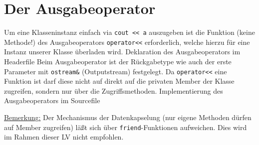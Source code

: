 \section{Der Ausgabeoperator}
\label{p:9.8}
Um eine Klasseninstanz einfach via \verb|cout << a|  auszugeben ist die
Funktion (keine Methode!) des Ausgabeoperators \verb|operator<<| erforderlich, welche
hierzu für eine Instanz unserer Klasse überladen wird.
%
{Deklaration des Ausgabeoperators im Headerfile}
%
Beim Ausgabeoperator ist der Rückgabetype wie auch der erste Parameter mit \verb|ostream&|
(Outputstream) festgelegt. Da \verb|operator<<| eine Funktion ist darf diese
nicht auf direkt auf die privaten Member der Klasse zugreifen, sondern
nur über die Zugriffsmethoden.
%
{Implementierung des Ausgabeoperators im Sourcefile}
%

\underline{Bemerkung:} Der Mechanismus der Datenkapselung
(nur eigene Methoden dürfen auf Member zugreifen) läßt sich über \texttt{friend}-Funktionen
 aufweichen. Dies wird im Rahmen dieser LV nicht empfohlen.
%


%









